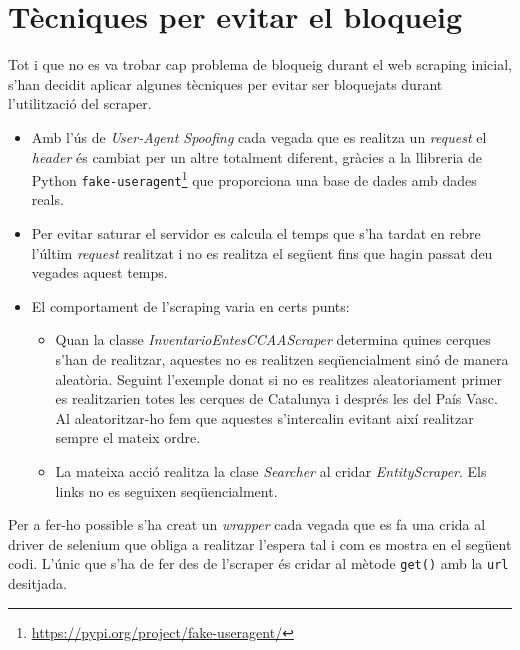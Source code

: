 \documentclass[12pt]{article}
\begin{document}
\section*{Tècniques per evitar el bloqueig}
Tot i que no es va trobar cap problema de bloqueig durant el web scraping inicial, s'han decidit aplicar algunes tècniques per evitar ser bloquejats durant l'utilització del scraper.
\begin{itemize}
    \item Amb l'ús de \textit{User-Agent Spoofing} cada vegada que es realitza un \textit{request} el \textit{header} és cambiat per un altre totalment diferent, gràcies a la llibreria de Python \texttt{fake-useragent}\footnote{\url{https://pypi.org/project/fake-useragent/}} que proporciona una base de dades amb dades reals. 
    \item Per evitar saturar el servidor es calcula el temps que s'ha tardat en rebre l'últim \textit{request} realitzat i no es realitza el següent fins que hagin passat deu vegades aquest temps.
    \item El comportament de l'scraping varia en certs punts:
    \begin{itemize}
        \item Quan la classe \textit{InventarioEntesCCAAScraper} determina quines cerques s'han de realitzar, aquestes no es realitzen seqüencialment sinó de manera aleatòria. Seguint l'exemple donat si no es realitzes aleatoriament primer es realitzarien totes les cerques de Catalunya i després les del País Vasc. Al aleatoritzar-ho fem que aquestes s'intercalin evitant així realitzar sempre el mateix ordre.
        \item La mateixa acció realitza la clase \textit{Searcher} al cridar \textit{EntityScraper}. Els links no es seguixen seqüencialment.
    \end{itemize}
\end{itemize}

Per a fer-ho possible s'ha creat un \textit{wrapper} cada vegada que es fa una crida al driver de selenium que obliga a realitzar l'espera tal i com es mostra en el següent codi. L'únic que s'ha de fer des de l'scraper és cridar al mètode \texttt{get()} amb la \texttt{url} desitjada.
\end{document}
